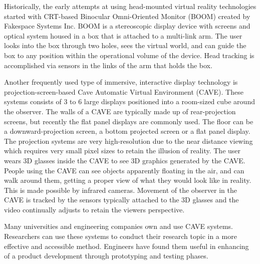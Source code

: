 Historically, the early attempts at using head-mounted virtual reality technologies started with CRT-based Binocular Omni-Oriented Monitor (BOOM) created by Fakespace Systems Inc. BOOM is a stereoscopic display device with screens and optical system housed in a box that is attached to a multi-link arm. The user looks into the box through two holes, sees the virtual world, and can guide the box to any position within the operational volume of the device. Head tracking is accomplished via sensors in the links of the arm that holds the box.

Another frequently used type of immersive, interactive display technology is projection-screen-based Cave Automatic Virtual Environment (CAVE). These systems consists of 3 to 6 large displays positioned into a room-sized cube around the observer. The walls of a CAVE are typically made up of rear-projection screens, but recently the flat panel displays are commonly used. The floor can be a downward-projection screen, a bottom projected screen or a flat panel display. The projection systems are very high-resolution due to the near distance viewing which requires very small pixel sizes to retain the illusion of reality. The user wears 3D glasses inside the CAVE to see 3D graphics generated by the CAVE. People using the CAVE can see objects apparently floating in the air, and can walk around them, getting a proper view of what they would look like in reality. This is made possible by infrared cameras. Movement of the observer in the CAVE is tracked by the sensors typically attached to the 3D glasses and the video continually adjusts to retain the viewers perspective.

Many universities and engineering companies own and use CAVE systems. Researchers can use these systems to conduct their research topic in a more effective and accessible method. Engineers have found them useful in enhancing of a product development through prototyping and testing phases.

